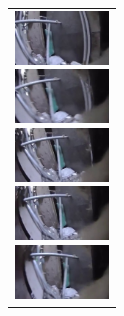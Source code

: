 \begin{figure}[H]
    \begin{tabular}{l}
      \begin{minipage}{0.165\hsize}
        \begin{center}
          \includegraphics[clip, width=2.5cm]{./Figures/still_bark1.eps}
        \end{center}
      \end{minipage}
      \begin{minipage}{0.165\hsize}
        \begin{center}
          \includegraphics[clip, width=2.5cm]{./Figures/still_bark2.eps}
        \end{center}
      \end{minipage}
      \begin{minipage}{0.165\hsize}
        \begin{center}
          \includegraphics[clip, width=2.5cm]{./Figures/still_bark3.eps}
        \end{center}
      \end{minipage}
      \begin{minipage}{0.165\hsize}
        \begin{center}
          \includegraphics[clip, width=2.5cm]{./Figures/still_bark4.eps}
        \end{center}
      \end{minipage}
      \begin{minipage}{0.165\hsize}
        \begin{center}
          \includegraphics[clip, width=2.5cm]{./Figures/still_bark5.eps}

\end{center}
\end{minipage}
\end{tabular}
\end{figure}
